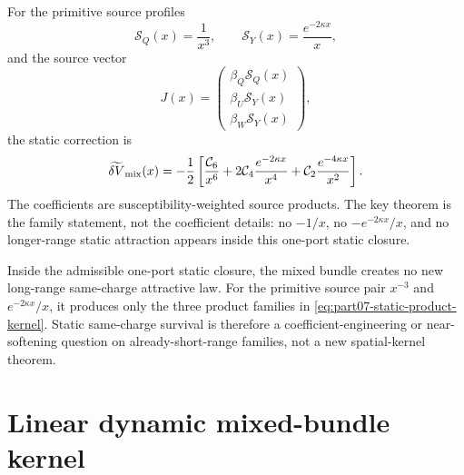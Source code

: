 For the primitive source profiles
\begin{equation}
\label{eq:part07-primitive-sources}
\mathcal S_Q(x)=\frac1{x^3},
\qquad
\mathcal S_Y(x)=\frac{e^{-2\kappa x}}{x},
\end{equation}
and the source vector
\begin{equation}
\label{eq:part07-primitive-source-vector}
J(x)=
\begin{pmatrix}
\beta_Q\mathcal S_Q(x)\\
\beta_U\mathcal S_Y(x)\\
\beta_W\mathcal S_Y(x)
\end{pmatrix},
\end{equation}
the static correction is
\begin{equation}
\label{eq:part07-static-product-kernel}
\widetilde{\delta V}_{\rm mix}(x)
=-\frac12\left[
\frac{\mathcal C_6}{x^6}
+2\mathcal C_4\frac{e^{-2\kappa x}}{x^4}
+\mathcal C_2\frac{e^{-4\kappa x}}{x^2}
\right].
\end{equation}
The coefficients are susceptibility-weighted source products.  The key theorem is the family statement, not the coefficient details: no \(-1/x\), no \(-e^{-2\kappa x}/x\), and no longer-range static attraction appears inside this one-port static closure.

\begin{theorem}
\label{thm:part07-static-square-law}
Inside the admissible one-port static closure, the mixed bundle creates no new long-range same-charge attractive law.  For the primitive source pair \(x^{-3}\) and \(e^{-2\kappa x}/x\), it produces only the three product families in \cref{eq:part07-static-product-kernel}.  Static same-charge survival is therefore a coefficient-engineering or near-softening question on already-short-range families, not a new spatial-kernel theorem.
\end{theorem}


\section{Linear dynamic mixed-bundle kernel}
\label{sec:part07_same_charge_rigid_mouth:linear-dynamic-mixed-bundle-kernel}

